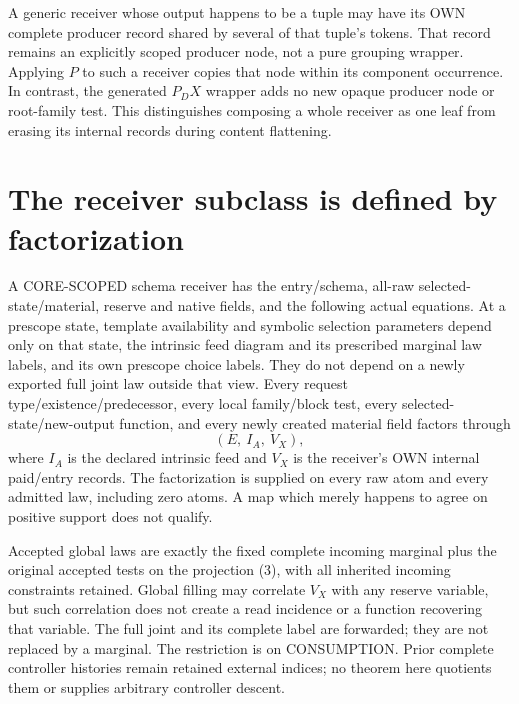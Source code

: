\documentclass[11pt]{article}
\begin{document}
A generic receiver whose output happens to be a tuple may have its OWN complete producer record shared by several of that tuple's tokens. That record remains an explicitly scoped producer node, not a pure grouping wrapper. Applying $P$ to such a receiver copies that node within its component occurrence. In contrast, the generated $P_DX$ wrapper adds no new opaque producer node or root-family test. This distinguishes composing a whole receiver as one leaf from erasing its internal records during content flattening.

\section{The receiver subclass is defined by factorization}
A CORE-SCOPED schema receiver has the entry/schema, all-raw selected-state/material, reserve and native fields, and the following actual equations. At a prescope state, template availability and symbolic selection parameters depend only on that state, the intrinsic feed diagram and its prescribed marginal law labels, and its own prescope choice labels. They do not depend on a newly exported full joint law outside that view. Every request type/existence/predecessor, every local family/block test, every selected-state/new-output function, and every newly created material field factors through
\[
          (E,\ I_A,\ V_X),                               \tag{3}
\]
where $I_A$ is the declared intrinsic feed and $V_X$ is the receiver's OWN internal paid/entry records. The factorization is supplied on every raw atom and every admitted law, including zero atoms. A map which merely happens to agree on positive support does not qualify.

Accepted global laws are exactly the fixed complete incoming marginal plus the original accepted tests on the projection (3), with all inherited incoming constraints retained. Global filling may correlate $V_X$ with any reserve variable, but such correlation does not create a read incidence or a function recovering that variable. The full joint and its complete label are forwarded; they are not replaced by a marginal. The restriction is on CONSUMPTION. Prior complete controller histories remain retained external indices; no theorem here quotients them or supplies arbitrary controller descent.
\end{document}
